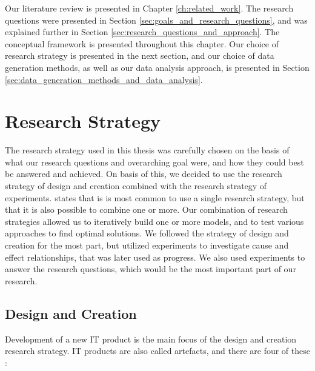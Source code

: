 Our literature review is presented in Chapter \ref{ch:related_work}. The research questions were presented in Section \ref{sec:goals_and_research_questions}, and was explained further in Section \ref{sec:research_questions_and_approach}. The conceptual framework is presented throughout this chapter. Our choice of research strategy is presented in the next section, and our choice of data generation methods, as well as our data analysis approach, is presented in Section \ref{sec:data_generation_methods_and_data_analysis}.


\section{Research Strategy}
\label{sec:research_strategy}
The research strategy used in this thesis was carefully chosen on the basis of what our research questions and overarching goal were, and how they could best be answered and achieved. On basis of this, we decided to use the research strategy of design and creation combined with the research strategy of experiments. \cite{oates2005researching} states that is is most common to use a single research strategy, but that it is also possible to combine one or more. Our combination of research strategies allowed us to iteratively build one or more models, and to test various approaches to find optimal solutions. We followed the strategy of design and creation for the most part, but utilized experiments to investigate cause and effect relationships, that was later used as progress. We also used experiments to answer the research questions, which would be the most important part of our research.

\subsection{Design and Creation}
\label{sec:design_and_creation}
Development of a new IT product is the main focus of the design and creation research strategy. IT products are also called artefacts, and there are four of these \citep{march1995design, oates2005researching}:

